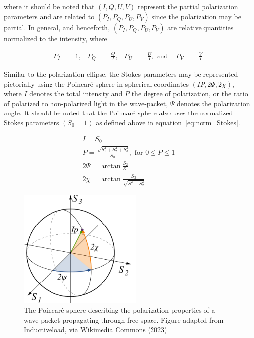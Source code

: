 \noindent where it should be noted that $(I, Q, U, V)$ represent the partial polarization parameters and are related to $(P_{I}, P_{Q}, P_{U}, P_{V})$ since the polarization may be partial. In general, and henceforth, $(P_{I}, P_{Q}, P_{U}, P_{V})$ are relative quantities normalized to the intensity, where

\begin{align}
    P_{I} &= 1, & P_{Q} &= \frac{Q}{I}, & P_{U} &= \frac{U}{I}, \text{   and } & P_{V} &= \frac{V}{I}.
    \label{eq:norm_Stokes}
\end{align}
\prgph

Similar to the polarization ellipse, the Stokes parameters may be represented pictorially using the Poincar{\'e} sphere in spherical coordinates $(IP, 2 \Psi, 2 \chi)$, where $I$ denotes the total intensity and $P$ the degree of polarization, or the ratio of polarized to non-polarized light in the wave-packet, $\Psi$ denotes the polarization angle. It should be noted that the Poincar{\'e} sphere also uses the normalized Stokes parameters $(S_{0} = 1)$ as defined above in equation~\ref{eq:norm_Stokes}.

\begin{equation}
    \begin{gathered}
        I = S_{0} \\
        P = \frac{\sqrt{S_{1}^2 + S_{2}^2 + S_{3}^2}}{S_{0}}, \text{ for } 0 \leq P \leq 1 \\
        2 \Psi = \arctan \frac{S_{2}}{S_{1}} \\
        2 \chi = \arctan \frac{S_{3}}{\sqrt{S_{1}^{2} + S_{2}^{2}}}
    \end{gathered}
    \label{eq:poincare_coords}
\end{equation}

\begin{figure}[t]
    \centering
    \includegraphics[width=6cm]{figures/2_poincare_sphere.pdf}
    \caption{The Poincar{\'e} sphere describing the polarization properties of a wave-packet propagating through free space. Figure adapted from Inductiveload, via \protect\href{https://commons.wikimedia.org/wiki/File:Poincaré_sphere.svg}{Wikimedia Commons} (2023)}
    \label{fig:poincare}
\end{figure}
\prgph

